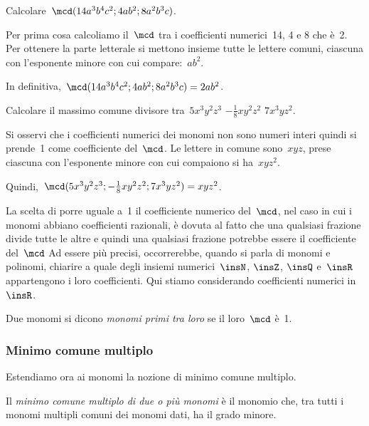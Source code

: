 \begin{exrig}
 \begin{esempio}
Calcolare~$\mcd (14a^{3}b^{4}c^{2};4ab^{2};8a^{2}b^{3}c)$.

Per prima cosa calcoliamo il~$\mcd$ tra i coefficienti numerici~14, 4 e
8 che è~2. Per ottenere la parte letterale si mettono insieme tutte
le lettere comuni, ciascuna con l'esponente minore con
cui compare:~$ab^{2}$.

In definitiva,~$\mcd (14a^{3}b^{4}c^{2};4ab^{2};8a^{2}b^{3}c)=2ab^{2}$.
 \end{esempio}

 \begin{esempio}
Calcolare il massimo comune divisore tra~$5x^{3}y^{2}z^{3}$ $-\frac{1}{8}xy^{2}z^{2}$ $7x^{3}yz^{2}$.


Si osservi che i coefficienti numerici dei monomi non sono numeri interi
quindi si prende~1 come coefficiente del~$\mcd$.
Le lettere in comune sono~$xyz$, prese ciascuna con
l'esponente minore con cui compaiono si ha~$xyz^{2}$.

Quindi,~$\mcd (5x^{3}y^{2}z^{3};-\frac{1}{8}xy^{2}z^{2};7x^{3}yz^{2})=xyz^{2}$.
 \end{esempio}
\end{exrig}

\osservazione La scelta di porre uguale a~1 il coefficiente numerico del~$\mcd$, nel
caso in cui i monomi abbiano coefficienti razionali, è dovuta al
fatto che una qualsiasi frazione divide tutte le altre e quindi una
qualsiasi frazione potrebbe essere il coefficiente del~$\mcd$ Ad essere
più precisi, occorrerebbe, quando si parla di monomi e polinomi,
chiarire a quale degli insiemi numerici~$\insN$, $\insZ$, $\insQ$ e~$\insR$ appartengono i loro
coefficienti. Qui stiamo considerando coefficienti numerici in~$\insR$.

\begin{definizione}
 Due monomi si dicono \emph{monomi primi tra loro} se il loro~$\mcd$ è~1.
\end{definizione}

\subsubsection{Minimo comune multiplo}

Estendiamo ora ai monomi la nozione di minimo comune multiplo.

\begin{definizione}
 Il \emph{minimo comune multiplo di due o più monomi}
è il monomio che, tra tutti i monomi multipli comuni dei monomi dati,
ha il grado minore.
\end{definizione}


